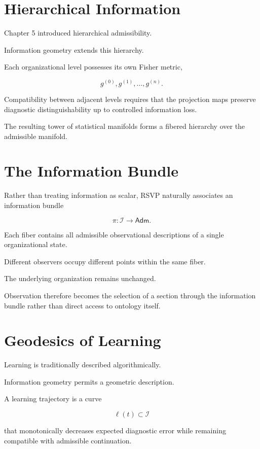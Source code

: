 \documentclass[11pt,oneside]{book}
\numberwithin{equation}{chapter}
\theoremstyle{definition}
\theoremstyle{plain}
\newcommand{\Adm}{\mathsf{Adm}}
\begin{document}
\section{Hierarchical Information}

Chapter 5 introduced hierarchical admissibility.

Information geometry extends this hierarchy.

Each organizational level possesses its own Fisher metric,

\[
g^{(0)},
g^{(1)},
\ldots,
g^{(n)}.
\]

Compatibility between adjacent levels requires that the projection maps
preserve diagnostic distinguishability up to controlled information loss.

The resulting tower of statistical manifolds forms a fibered hierarchy over
the admissible manifold.

\section{The Information Bundle}

Rather than treating information as scalar, RSVP naturally associates an
information bundle

\[
\pi:
\mathcal I
\rightarrow
\Adm.
\]

Each fiber contains all admissible observational descriptions of a single
organizational state.

Different observers occupy different points within the same fiber.

The underlying organization remains unchanged.

Observation therefore becomes the selection of a section through the
information bundle rather than direct access to ontology itself.

\section{Geodesics of Learning}

Learning is traditionally described algorithmically.

Information geometry permits a geometric description.

A learning trajectory is a curve

\[
\ell(t)
\subset
\mathcal I
\]

that monotonically decreases expected diagnostic error while remaining
compatible with admissible continuation.
\end{document}
